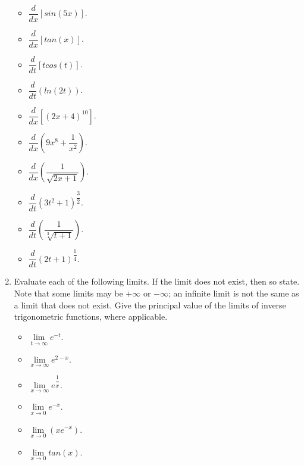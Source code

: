 \documentclass[fleqn]{article}
\begin{document}
\begin{enumerate}
\begin{itemize}
      \item $\dfrac{d}{dx} \left[sin(5x)\right]$.

      \item $\dfrac{d}{dx} \left[tan(x)\right]$.

      \item $\dfrac{d}{dt} \left[t cos(t)\right]$.

      \item $\dfrac{d}{dt} \left(ln(2t)\right)$.

      \item $\dfrac{d}{dx} \left[\left(2x+4\right)^{10}\right]$.

      \item $\dfrac{d}{dx} \left(9x^8+\dfrac{1}{x^2}\right)$.

      \item $\dfrac{d}{dx} \left(\dfrac{1}{\sqrt{2x+1}}\right)$.

      \item $\dfrac{d}{dt} \left(3t^2+1\right)^{\dfrac{3}{2}}$.

      \item $\dfrac{d}{dt} \left(\dfrac{1}{\sqrt[3]{t+1}}\right)$.

      \item $\dfrac{d}{dt} \left(2t+1\right)^{\dfrac{1}{4}}$.
    \end{itemize}

    \item Evaluate each of the following limits. If the limit does not exist, then so
    state. Note that some limits may be $+\infty$ or $-\infty$; an infinite limit is not the
    same as a limit that does not exist. Give the principal value of the limits of
    inverse trigonometric functions, where applicable.
    \begin{itemize}
      \item $\lim\limits_{t \to \infty} e^{-t}$.
      
      \item $\lim\limits_{x \to \infty} e^{2-x}$. 

      \item $\lim\limits_{x \to \infty} e^{\dfrac{1}{x}}$. 

      \item $\lim\limits_{x \to 0} e^{-x}$. 

      \item $\lim\limits_{x \to 0} \left(x e^{-x}\right)$.
      
      \item $\lim\limits_{x \to 0} tan(x)$. 


\end{itemize}
\end{enumerate}
\end{document}
